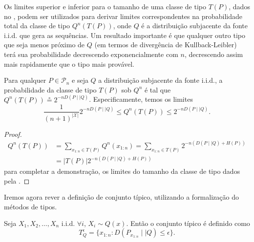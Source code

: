 Os limites superior e inferior para o tamanho de uma classe de tipo $T(P)$, dados no
, podem ser utilizados para derivar limites correspondentes na probabilidade total
da classe de tipo $Q^n(T(P))$, onde $Q$ é a distribuição subjacente da fonte i.i.d. que gera as sequências.
Um resultado importante é que qualquer outro tipo que seja menos próximo de $Q$ (em termos de divergência de Kullback-Leibler)
terá sua probabilidade decrescendo exponencialmente com $n$, decrescendo assim mais rapidamente que o tipo mais provável.

\begin{theorem}
 Para qualquer $P \in \mathcal{P}_n$ e seja $Q$ a distribuição subjacente da fonte i.i.d., a probabilidade da classe de tipo
$T(P)$ sob $Q^n$ é tal que $Q^n(T(P)) \circeq 2^{-n D(P \mid \mid Q)}$. Especificamente, temos os limites
\begin{equation}
 \frac{1}{(n+1)^{\vert \mathcal{X} \vert}} 2^{-n D(P \mid \mid Q)} \leq Q^n(T(P)) \leq 2^{-nD(P \mid \mid Q)} .
\end{equation}
\end{theorem}
\begin{proof}
  \begin{subequations}
   \begin{align}
   Q^n(T(P)) &= \sum_{x_{1:n} \in T(P)} Q^n(x_{1:n}) = \sum_{x_{1:n} \in T(P)} 2^{-n (D(P \mid \mid Q) + H(P))} \\
             &= \vert T(P) \vert 2^{-n (D(P \mid \mid Q) + H(P))}
   \end{align}
  \end{subequations}
  para completar a demonstração, os limites do tamanho da classe de tipo dados pela .
\end{proof}


Iremos agora rever a definição de conjunto típico, utilizando a formalização do métodos de tipos.
\begin{definition}
  Seja $X_1, X_2, \ldots, X_n$ i.i.d. $\forall i$, $X_i \sim Q(x)$. Então o conjunto típico é definido como
  \begin{equation}
    T^{\epsilon}_{Q} = \{ x_{1:n} : D(P_{x_{1:n}} \mid \mid Q) \leq \epsilon \} .
  \end{equation}
\end{definition}

